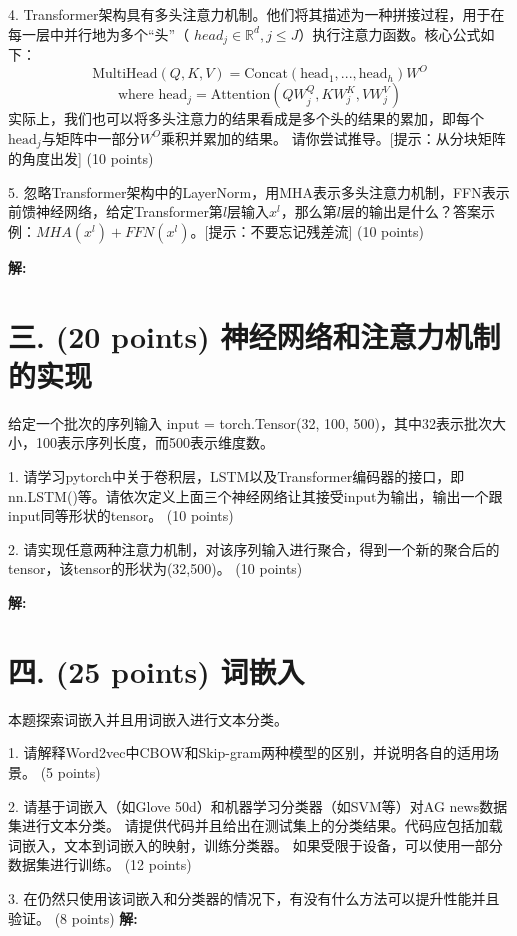 \documentclass[8pt]{article}
\begin{document}
4. Transformer架构具有多头注意力机制。他们将其描述为一种拼接过程，用于在每一层中并行地为多个“头”（ $head_j \in \mathbb{R}^d, j \leq J $）执行注意力函数。核心公式如下：
\[
\text{MultiHead}(Q, K, V) = \text{Concat}(\text{head}_1, ..., \text{head}_h)W^{O}
\]
\[
\text{where } \text{head}_j = \text{Attention}(QW_j^{Q}, KW_j^{K}, VW_j^{V}) 
\]
实际上，我们也可以将多头注意力的结果看成是多个头的结果的累加，即每个$\text{head}_j$与矩阵中一部分$W^{O}$乘积并累加的结果。
请你尝试推导。[提示：从分块矩阵的角度出发] (10 points)


5. 忽略Transformer架构中的LayerNorm，用MHA表示多头注意力机制，FFN表示前馈神经网络，给定Transformer第$l$层输入$x^l$，那么第$l$层的输出是什么？答案示例：$MHA(x^l) + FFN(x^l)$。[提示：不要忘记残差流] (10 points)

\textbf{\large 解:}
\vspace{10em}


\par



\section*{三. (20 points) 神经网络和注意力机制的实现}
给定一个批次的序列输入 input = torch.Tensor(32, 100, 500)，其中32表示批次大小，100表示序列长度，而500表示维度数。

1. 请学习pytorch中关于卷积层，LSTM以及Transformer编码器的接口，即nn.LSTM()等。请依次定义上面三个神经网络让其接受input为输出，输出一个跟input同等形状的tensor。 (10 points)

2. 请实现任意两种注意力机制，对该序列输入进行聚合，得到一个新的聚合后的tensor，该tensor的形状为(32,500)。 (10 points)

\textbf{\large 解:}

\vspace{10em}

\par


\section*{四. (25 points) 词嵌入}
本题探索词嵌入并且用词嵌入进行文本分类。

1. 请解释Word2vec中CBOW和Skip-gram两种模型的区别，并说明各自的适用场景。 (5 points)

2. 请基于词嵌入（如Glove 50d）和机器学习分类器（如SVM等）对AG news数据集进行文本分类。
请提供代码并且给出在测试集上的分类结果。代码应包括加载词嵌入，文本到词嵌入的映射，训练分类器。
如果受限于设备，可以使用一部分数据集进行训练。 (12 points)

3. 在仍然只使用该词嵌入和分类器的情况下，有没有什么方法可以提升性能并且验证。 (8 points)
\textbf{\large 解:}

\vspace{10em}
\end{document}
